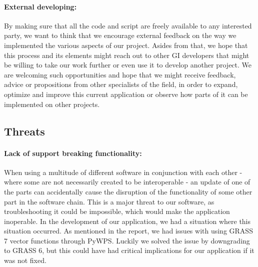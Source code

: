 \paragraph{External developing:} By making sure that all the code and script are freely available to any interested party, we want to think that we encourage external feedback on the way we implemented the various aspects of our project. Asides from that, we hope that this process and its elements might reach out to other GI developers that might be willing to take our work further or even use it to develop another project. We are welcoming such opportunities and hope that we might receive feedback, advice or propositions from other specialists of the field, in order to expand, optimize and improve this current application or observe how parts of it can be implemented on other projects.


\subsection{Threats}
\paragraph{Lack of support breaking functionality:} When using a multitude of different software in conjunction with each other - where some are not necessarily created to be interoperable - an update of one of the parts can accidentally cause the disruption of the functionality of some other part in the software chain. This is a major threat to our software, as troubleshooting it could be impossible, which would make the application inoperable. In the development of our application, we had a situation where this situation occurred. As mentioned in the report, we had issues with using GRASS 7 vector functions through PyWPS. Luckily we solved the issue by downgrading to GRASS 6, but this could have had critical implications for our application if it was not fixed. 